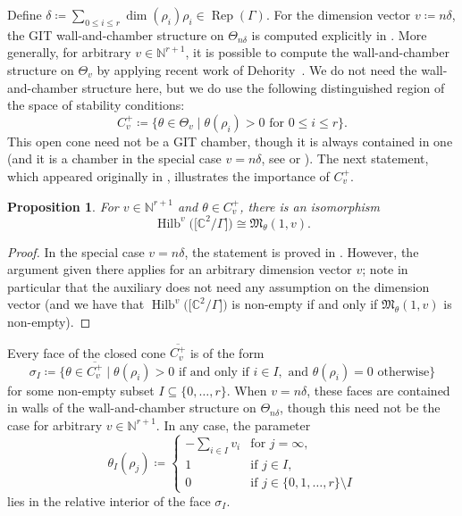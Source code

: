 \documentclass[11pt]{article}
\numberwithin{equation}{section}
\newtheorem{Proposition}[Theorem]{Proposition}
 { \theoremstyle{definition}
\newtheorem{Definition}[Theorem]{Definition}
\newtheorem{Example}[Theorem]{Example}
\newtheorem{Remark}[Theorem]{Remark}
}
\newcommand{\SC}{\mathbb{C}} %
\newcommand{\Rep}{\operatorname{Rep}}
\DeclareMathOperator{\Hilb}{\mathrm{Hilb}}
\numberwithin{equation}{section}
\begin{document}
Define $\delta\coloneqq \sum_{0\leq i\leq r} \dim(\rho_i)\rho_i\in \Rep(\Gamma)$. For the dimension vector $v\coloneqq n\delta$, the GIT wall-and-chamber structure on $\Theta_{n\delta}$ is computed explicitly in \cite[Theorem 4.6]{bellamy2020birational}. More generally, for arbitrary $v \in \mathbb{N}^{r+1}$,
it is possible to compute the wall-and-chamber structure on $\Theta_v$ by applying recent work of
Dehority~\cite[Proposition 4.8]{dehority2020affinizations}. We do not need the wall-and-chamber structure here, but we do use the following distinguished region of the space of stability conditions:
\[ C^{+}_v\coloneqq \{\theta \in \Theta_v \mid \theta(\rho_i) > 0 \textrm{ for } 0 \leq i \leq r \}. \]
This open cone need not be a GIT chamber, though it is always contained in one (and it is a chamber in the special case $v=n\delta$, see \cite[Example~2.1]{bellamy2020birational} or \cite[Section~2.8]{nakajima2009quiver}).
The next statement, which appeared originally in \cite[Section~2]{nakajima2002geometric}, illustrates the importance of $C^{+}_v$.
\begin{Proposition}
\label{prop:hilbiso}
For $v \in \mathbb{N}^{r+1}$ and $\theta \in C^{+}_v$, there is an isomorphism
\[ \Hilb^{v}\big(\big[\SC^2/\Gamma\big]\big) \cong \mathfrak{M}_{\theta}(1,v). \]
\end{Proposition}
\begin{proof}
In the special case $v=n\delta$,
the statement is proved in \cite[Theorem 4.6]{kuznetsov2007quiver}. However, the argument given there applies for
an arbitrary dimension vector $v$; note in particular that the auxiliary \cite[Corollary 3.5]{kuznetsov2007quiver}
does not need any assumption on the dimension vector (and we have that $\Hilb^{v}\big(\big[\SC^2/\Gamma\big]\big)$ is non-empty if and only if $\mathfrak{M}_{\theta}(1,v)$ is non-empty).
\end{proof}

Every face of the closed cone $\overline{C^{+}_v}$ is of the form
\[ \sigma_I\coloneqq\big\{\theta \in \overline{C^{+}_v} \mid \theta(\rho_i) > 0 \textrm{ if and only if } i \in I, \textrm{ and } \theta(\rho_i) = 0 \textrm{ otherwise} \big\} \]
for some non-empty subset $I \subseteq\{0,\dots,r\}$. When $v=n\delta$, these faces are contained in walls of the wall-and-chamber structure on $\Theta_{n\delta}$, though this need not be the case for arbitrary $v \in \mathbb{N}^{r+1}$.
In any case, the parameter
\begin{equation} \label{eqn:theta_I}
\theta_I (\rho_j) \coloneqq
\begin{cases}
\displaystyle -\sum_{i \in I} v_i & \textrm{for }j=\infty, \\
1 & \textrm{if } j \in I, \\
0 & \textrm{if } j \in \{0,1,\dots,r\} \setminus I
\end{cases}
\end{equation}
lies in the relative interior of the face $\sigma_I$.
\end{document}
